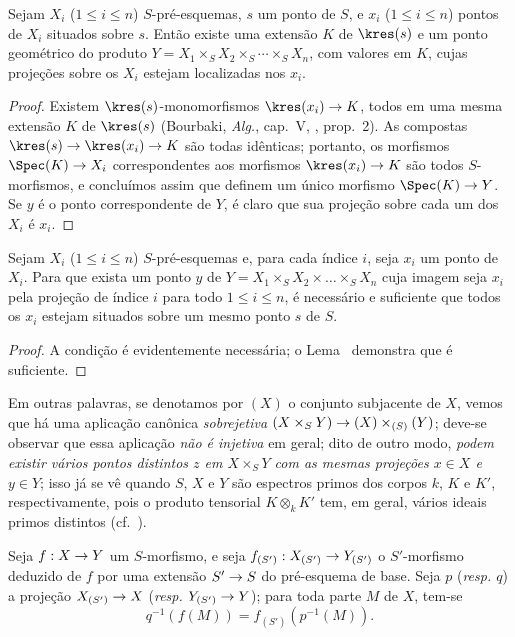 \documentclass[oneside]{amsart}
\makeatletter
\renewcommand{\leq}{\leqslant}
\newcommand{\ega@arrow}[2]{\mathchoice{#1}{#2}{#2}{#2}}
\renewcommand{\to}{\ega@arrow{\longrightarrow}{\rightarrow}}
\let\EGAOriginalLabel\label
\renewcommand{\label}[1]{\phantomsection\EGAOriginalLabel{#1}}
\makeatother
\begin{document}
\begin{lemma}[3.4.6]
\label{I.3.4.6}
Sejam $X_i$ ($1\leq i\leq n$) $S$-pré-esquemas, $s$ um ponto de $S$, e $x_i$
($1\leq i\leq n$) pontos de $X_i$ situados sobre $s$. Então existe uma
extensão $K$ de $\kres(s)$ e um ponto geométrico do produto
$Y=X_1\times_S X_2\times_S\cdots\times_S X_n$, com valores em $K$, cujas
projeções sobre os $X_i$ estejam localizadas nos $x_i$.
\end{lemma}

\begin{proof}
Existem $\kres(s)$-monomorfismos $\kres(x_i)\to K$, todos em uma mesma
extensão $K$ de $\kres(s)$ (Bourbaki, \emph{Alg.}, cap.~V, ,
prop.~2). As compostas $\kres(s)\to\kres(x_i)\to K$ são todas idênticas;
portanto, os morfismos $\Spec(K)\to X_i$ correspondentes aos morfismos
$\kres(x_i)\to K$ são todos $S$-morfismos, e concluímos assim que definem um
único morfismo $\Spec(K)\to Y$. Se $y$ é o ponto correspondente de $Y$, é
claro que sua projeção sobre cada um dos $X_i$ é $x_i$.
\end{proof}

\begin{proposition}[3.4.7]
\label{I.3.4.7}
Sejam $X_i$ ($1\leq i\leq n$) $S$-pré-esquemas e, para cada índice $i$,
seja $x_i$ um ponto de $X_i$. Para que exista um ponto $y$ de
$Y=X_1\times_S X_2\times\ldots\times_S X_n$ cuja imagem seja $x_i$ pela
projeção de índice $i$ para todo $1\leq i\leq n$, é necessário e suficiente
que todos os $x_i$ estejam situados sobre um mesmo ponto $s$ de $S$.
\end{proposition}

\begin{proof}
A condição é evidentemente necessária; o Lema~ demonstra que é
suficiente.
\end{proof}

Em outras palavras, se denotamos por $(X)$ o conjunto subjacente de $X$,
vemos que há uma aplicação canônica \emph{sobrejetiva}
$(X\times_S Y)\to(X)\times_{(S)}(Y)$; deve-se observar que essa aplicação
\emph{não é injetiva} em geral; dito de outro modo, \emph{podem existir vários
pontos distintos $z$ em $X\times_S Y$ com as mesmas projeções $x\in X$ e
$y\in Y$}; isso já se vê quando $S$, $X$ e $Y$ são espectros primos dos
corpos $k$, $K$ e $K'$, respectivamente, pois o produto tensorial
$K\otimes_k K'$ tem, em geral, vários ideais primos distintos
(cf.~).

\begin{corollary}[3.4.8]
\label{I.3.4.8}
Seja $f:X\to Y$ um $S$-morfismo, e seja
$f_{(S')}:X_{(S')}\to Y_{(S')}$ o $S'$-morfismo deduzido de $f$ por uma
extensão $S'\to S$ do pré-esquema de base. Seja $p$ (\emph{resp. $q$}) a
projeção $X_{(S')}\to X$ (\emph{resp. $Y_{(S')}\to Y$}); para toda parte $M$
de $X$, tem-se
\[
  q^{-1}(f(M))=f_{(S')}(p^{-1}(M)).
\]
\end{corollary}
\end{document}
